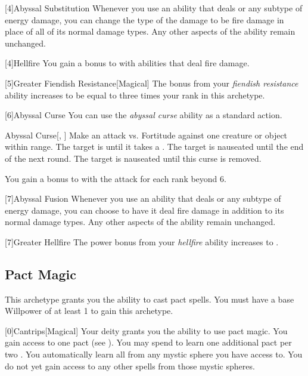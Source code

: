         [4]{Abyssal Substitution} Whenever you use an ability that deals  or any subtype of energy damage, you can change the type of the damage to be fire damage in place of all of its normal damage types.
        Any other aspects of the ability remain unchanged.

        [4]{Hellfire} You gain a  bonus to  with abilities that deal fire damage.

        [5]{Greater Fiendish Resistance}[Magical] The bonus from your \textit{fiendish resistance} ability increases to be equal to three times your rank in this archetype.

        [6]{Abyssal Curse} You can use the \textit{abyssal curse} ability as a standard action.
        \begin{freeability}{Abyssal Curse}[, ]
            Make an attack vs. Fortitude against one creature or object within \rngmed range.
            \hit The target is  until it takes a .
            \glance The target is nauseated until the end of the next round.
            \crit The target is nauseated until this curse is removed.

            \rankline
            You gain a  bonus to  with the attack for each rank beyond 6.
        \end{freeability}

        [7]{Abyssal Fusion} Whenever you use an ability that deals  or any subtype of energy damage, you can choose to have it deal fire damage in addition to its normal damage types.
        Any other aspects of the ability remain unchanged.

        [7]{Greater Hellfire} The power bonus from your \textit{hellfire} ability increases to .

    \newpage
    \subsection{Pact Magic}
        This archetype grants you the ability to cast pact spells.
        You must have a base Willpower of at least 1 to gain this archetype.

        [0]{Cantrips}[Magical]
        Your deity grants you the ability to use pact magic.
        You gain access to one pact  (see ).
        You may spend  to learn one additional pact  per two .
        You automatically learn all  from any mystic sphere you have access to.
        You do not yet gain access to any other spells from those mystic spheres.

